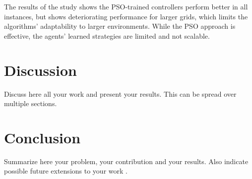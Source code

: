 \documentclass[a4paper,12pt]{article}
\begin{document}
The results of the study shows the PSO-trained controllers perform better in all instances, but shows deteriorating performance for larger grids, which limits the algorithms' adaptability to larger environments.
While the PSO approach is effective, the agents' learned strategies are limited and not scalable.

\section{Discussion}
Discuss here all your work and present your results. This can be spread over multiple sections.

\section{Conclusion}
Summarize here your problem, your contribution and your results. Also indicate possible future extensions to your work \cite{09OLI00}.



\end{document}
